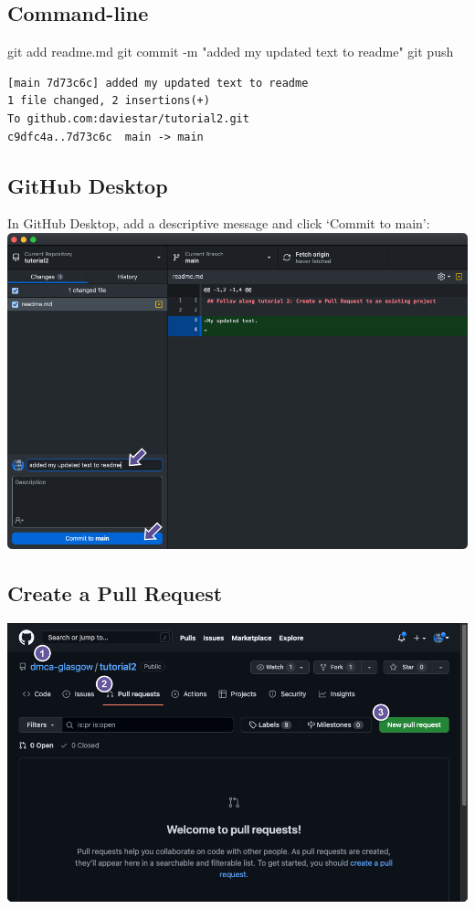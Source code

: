 \documentclass[
  letterpaper,
  DIV=11,
  numbers=noendperiod]{scrartcl}
\newenvironment{Shaded}{\begin{snugshade}}{\end{snugshade}}
\newcommand{\NormalTok}[1]{\textcolor[rgb]{0.00,0.23,0.31}{#1}}
\newcommand{\SpecialCharTok}[1]{\textcolor[rgb]{0.37,0.37,0.37}{#1}}
\newcommand{\StringTok}[1]{\textcolor[rgb]{0.13,0.47,0.30}{#1}}
\begin{document}
\subsection{Command-line}

\begin{Shaded}
\begin{Highlighting}[]
\NormalTok{git add readme.md}
\NormalTok{git commit }\SpecialCharTok{{-}}\NormalTok{m }\StringTok{"added my updated text to readme"}
\NormalTok{git push}
\end{Highlighting}
\end{Shaded}

\begin{verbatim}
[main 7d73c6c] added my updated text to readme
1 file changed, 2 insertions(+)
To github.com:daviestar/tutorial2.git
c9dfc4a..7d73c6c  main -> main
\end{verbatim}

\subsection{GitHub Desktop}

In GitHub Desktop, add a descriptive message and click `Commit to main':
\includegraphics{images/image82.png}

\subsection{Create a Pull Request}\label{create-a-pull-request}

\includegraphics{images/image83.png}
\end{document}
